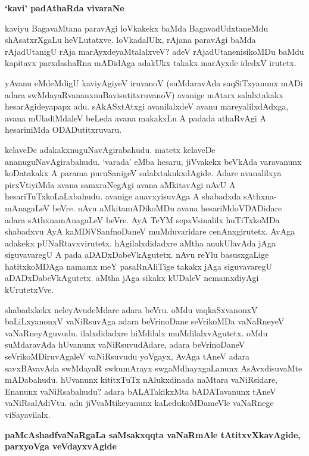 {\bigskip
\noindent
{\large\bf `kavi' padAthaRda vivaraNe}}\label{page184}
\medskip

\noindent
kaviyu BagavaMtana paravAgi loVkakekx baMda BagavadUdxtaneMdu shAsatxrXgaLu heVLutatxve. loVka\-dalUlx, rAjana paravAgi baMda rAjadUtanigU rAja marAyxdeyaMtalalxveV? adeV rAjadUtanenisikoMDu baMdu kapitavx parxdashaRna mADidAga adakUkx takakx marAyxde idedxV irutetx. 

yAvanu eMdeMdigU kavi\-yAgiyeV iruvanoV (suMdaravAda saqSiTxyanunx mADi adara swMdayaRvananxnuBavisutitxruvanoV) avanige mAtarx salalxtakakx hesarAgideyapapx adu. sAkASxtAtxgi avanilalxdeV avanu mare\-yalilxdAdxga, avana mUladiMdaleV beLeda avana makakxLu A padada athaRvAgi A hesariniMda ODADutitxruvaru. 

kelaveDe adakakxnuguNavAgirabahudu. matetx kelaveDe ananuguNavAgirabahudu. `varada' eMba hesaru, jiVvakekx beVkAda varavanunx koDa\-takakx A parama puruSanigeV salalxtakukxdAgide. Adare avanalilxya pirxVtiyiMda avana samxraNegAgi avana aMkitavAgi nAvU A hesariTuTxkoLaLxbahudu. avanige anavxyi\-suvAga A shabadxda sAthxna-\-mAnagaLeV beVre. nAvu aMkitamADikoMDu avana hesariMdoVDADidare adara sAthxnamAnagaLeV beVre. AyA TeYM sepxVsinalilx huTiTx\-koMDa shabadxvu AyA kaMDiVSanfnoDaneV muMduvaridare cenAnxgirutetx. AvAga adakekx pUNaRtavxvirutetx. hAgilalxdidadxre aMtha anukUlavAda jAga siguvavaregU A pada aDADxDabeVkAgutetx. nAvu reYlu basusxgaLige hatitxkoMDAga namamx meY pasaR\-nAliTige takakx jAga siguvavaregU aDADxDabeVkAgutetx. aMtha jAga sikakx kUDaleV nemamxdiyAgi kUrutetxVve. 

shabadxkekx neleyAvudeMdare adara beVru. oMdu vaqkaSxvanonxV baLiLxyanonxV vaNiRsuvAga adara beVrinoDane seVrikoMDa vaNaRneyeV vaNaRneyAguvudu. ilalxdidadxre hiMdilalx muMdilalxvAgutetx. oMdu suMdaravAda hUvanunx vaNiRsu\-vudAdare, adara beVrinoDaneV seVrikoMDiruvAgaleV vaNiRsuvudu yoVgayx, AvAga tAneV adara savxBAvavAda swMdayaR swkumArayx swgaMdhayxgaLanunx AsAvxdisuvaMte mADabahudu. hUvanunx kititxTuTx nAlukxdinada naMtara vaNiRsidare, Enanunx vaNiRsabahudu? adara bALATakikxMta bADATavanunx tAneV vaNiRsalAdiVtu. adu jiVvaMtikeyanunx kaLedukoMDameVle vaNaRnege viSayavilalx.

{\bigskip
\noindent
{\large\bf paMcAshadfvaNaRgaLa saMsakxqqta vaNaRmAle tAtitxvXkavAgide, parxyoVga veVdayxvAgide}}\label{page185}
\medskip

